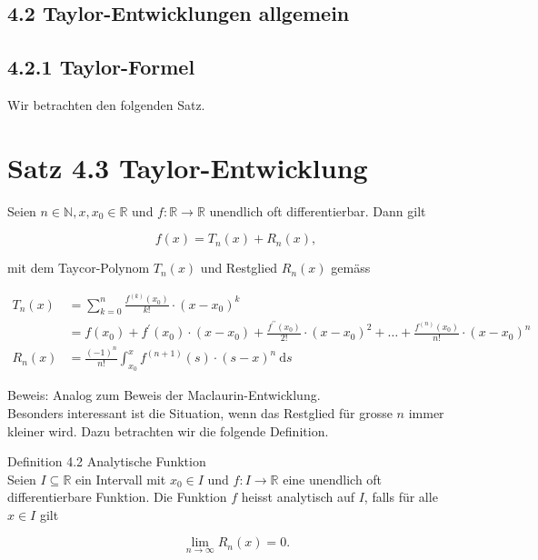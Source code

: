 \documentclass[10pt]{article}
\begin{document}
\subsection*{4.2 Taylor-Entwicklungen allgemein}
\subsection*{4.2.1 Taylor-Formel}
Wir betrachten den folgenden Satz.

\section*{Satz 4.3 Taylor-Entwicklung}
Seien $n \in \mathbb{N}, x, x_{0} \in \mathbb{R}$ und $f: \mathbb{R} \rightarrow \mathbb{R}$ unendlich oft differentierbar. Dann gilt


\begin{equation*}
f(x)=T_{n}(x)+R_{n}(x), \tag{4.17}
\end{equation*}


mit dem Taycor-Polynom $T_{n}(x)$ und Restglied $R_{n}(x)$ gemäss


\begin{align*}
T_{n}(x) & =\sum_{k=0}^{n} \frac{f^{(k)}\left(x_{0}\right)}{k!} \cdot\left(x-x_{0}\right)^{k} \\
& =f\left(x_{0}\right)+f^{\prime}\left(x_{0}\right) \cdot\left(x-x_{0}\right)+\frac{f^{\prime \prime}\left(x_{0}\right)}{2!} \cdot\left(x-x_{0}\right)^{2}+\ldots+\frac{f^{(n)}\left(x_{0}\right)}{n!} \cdot\left(x-x_{0}\right)^{n}  \tag{4.18}\\
R_{n}(x) & =\frac{(-1)^{n}}{n!} \int_{x_{0}}^{x} f^{(n+1)}(s) \cdot(s-x)^{n} \mathrm{~d} s
\end{align*}


Beweis: Analog zum Beweis der Maclaurin-Entwicklung.\\
Besonders interessant ist die Situation, wenn das Restglied für grosse $n$ immer kleiner wird. Dazu betrachten wir die folgende Definition.

Definition 4.2 Analytische Funktion\\
Seien $I \subseteq \mathbb{R}$ ein Intervall mit $x_{0} \in I$ und $f: I \rightarrow \mathbb{R}$ eine unendlich oft differentierbare Funktion. Die Funktion $f$ heisst analytisch auf $I$, falls für alle $x \in I$ gilt


\begin{equation*}
\lim _{n \rightarrow \infty} R_{n}(x)=0 . \tag{4.19}
\end{equation*}
\end{document}
